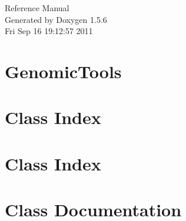 \documentclass[a4paper]{book}
\begin{document}
\begin{titlepage}
\vspace*{7cm}
\begin{center}
{\Large Reference Manual}\\
\vspace*{1cm}
{\large Generated by Doxygen 1.5.6}\\
\vspace*{0.5cm}
{\small Fri Sep 16 19:12:57 2011}\\
\end{center}
\end{titlepage}
\clearemptydoublepage
{}
\tableofcontents
\clearemptydoublepage
{}
\chapter{GenomicTools}
\label{index}\hypertarget{index}{}
\chapter{Class Index}

\chapter{Class Index}

\chapter{Class Documentation}

















\printindex
\end{document}
